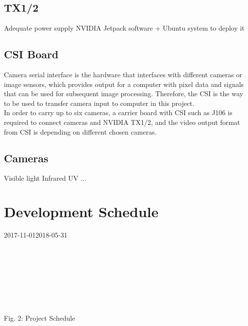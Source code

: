 \documentclass[letterpaper,10pt,serif,draftclsnofoot,onecolumn,compsoc,titlepage]{IEEEtran}
\begin{document}
\subsection{TX1/2}
		\subitem Adequate power supply
		\subitem NVIDIA Jetpack software + Ubuntu system to deploy it\\
\subsection{CSI Board}
		Camera serial interface is the hardware that interfaces with different cameras 
		or image sensors, which provides output for a computer with pixel data and 
		signals that can be used for subsequent image processing. Therefore, the CSI 
		is the way to be used to transfer camera input to computer in this project.\\
		In order to carry up to six cameras, a carrier board with CSI such as J106 is 
		required to connect cameras and NVIDIA TX1/2, and the video output format from 
		CSI is depending on different chosen cameras.\\

\subsection{Cameras}
		\subitem Visible light
		\subitem Infrared
		\subitem UV
		\subitem ...\\


\section{Development Schedule}
	\begin{ganttchart}
    	[hgrid, x unit=0.77mm, y unit chart=9.0mm, title label font=\normalsize, time slot format=isodate]
    	{2017-11-01}{2018-05-31}
    	\\
    	\\
    	\\
    	\\
    	\\
    	\\
    	\\
    	\\
	\end{ganttchart}
\begin{center}
	Fig. 2: Project Schedule
\end{center}	
\end{document}
